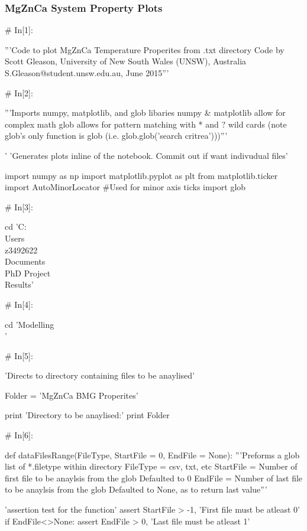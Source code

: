 \documentclass[a4paper,8pt]{article}
\begin{document}
\subsubsection{MgZnCa System Property Plots}

\begin{python}
# In[1]:

'''Code to plot MgZnCa Temperature Properites from .txt directory
Code by Scott Gleason, University of New South Wales (UNSW), Australia 
S.Gleason@student.unsw.edu.au, June 2015'''


# In[2]:

'''Imports numpy, matplotlib, and glob libaries 
numpy & matplotlib allow for complex math
glob allows for pattern matching with * and ? wild cards
(note glob's only function is glob (i.e. glob.glob('search critrea')))'''

'%
'Generates plots inline of the notebook. Commit out if want indivudual files'

import numpy as np
import matplotlib.pyplot as plt
from matplotlib.ticker import AutoMinorLocator #Used for minor axis ticks
import glob


# In[3]:

cd 'C:\\Users\\z3492622\\Documents\\PhD Project\\Results'


# In[4]:

cd 'Modelling\\'


# In[5]:

'Directs to directory containing files to be anaylised'

Folder = 'MgZnCa BMG Properites'

print 'Directory to be anaylised:'
print Folder


# In[6]:

def dataFilesRange(FileType, StartFile = 0, EndFile = None):
'''Preforms a glob list of *.filetype within directory
FileType = csv, txt, etc
StartFile = Number of first file to be anaylsis from the glob
Defaulted to 0
EndFile = Number of last file to be anaylsis from the glob
Defaulted to None, as to return last value'''

'assertion test for the function'
assert StartFile > -1, 'First file must be atleast 0'
if EndFile<>None:
assert EndFile > 0, 'Last file must be atleast 1'


\end{python}
\end{document}
